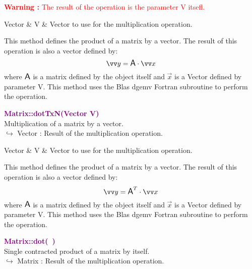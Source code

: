 \hspace*{10mm}\textcolor{red}{\textbf{Warning :}  The result of the operation is the parameter V itsefl.}

\begin{tcolorbox}[width=\textwidth,myArgs,tabularx={ll|R}]
Vector & V & Vector to use for the multiplication operation.
\end{tcolorbox}

This method defines the product of a matrix by a vector.
The result of this operation is also a vector defined by:
\begin{equation*}
\overrightarrow{y} = \A \cdot \overrightarrow{x}
\end{equation*}
where $\mbox{\large\ensuremath{\mathsf{A}}}$ is a matrix defined by the object itself and $\overrightarrow{x}$ is a Vector defined by parameter V.
This method uses the Blas \textsf{dgemv} Fortran subroutine to perform the operation.

\textcolor{purple}{\textbf{Matrix::dotTxN(Vector V)}}\label{Matrix::dotTxN(Vector V)}\\
Multiplication of a matrix by a vector.\\ \hspace*{10mm}$\hookrightarrow$ Vector : Result of the multiplication operation.

\begin{tcolorbox}[width=\textwidth,myArgs,tabularx={ll|R}]
Vector & V & Vector to use for the multiplication operation.
\end{tcolorbox}

This method defines the product of a matrix by a vector.
The result of this operation is also a vector defined by:
\begin{equation*}
\overrightarrow{y} = \A^T \cdot \overrightarrow{x}
\end{equation*}
where $\mbox{\large\ensuremath{\mathsf{A}}}$ is a matrix defined by the object itself and $\overrightarrow{x}$ is a Vector defined by parameter V.
This method uses the Blas \textsf{dgemv} Fortran subroutine to perform the operation.

\textcolor{purple}{\textbf{Matrix::dot(~)}}\label{Matrix::dot()}\\
Single contracted product of a matrix by itself.\\ \hspace*{10mm}$\hookrightarrow$ Matrix : Result of the multiplication operation.

